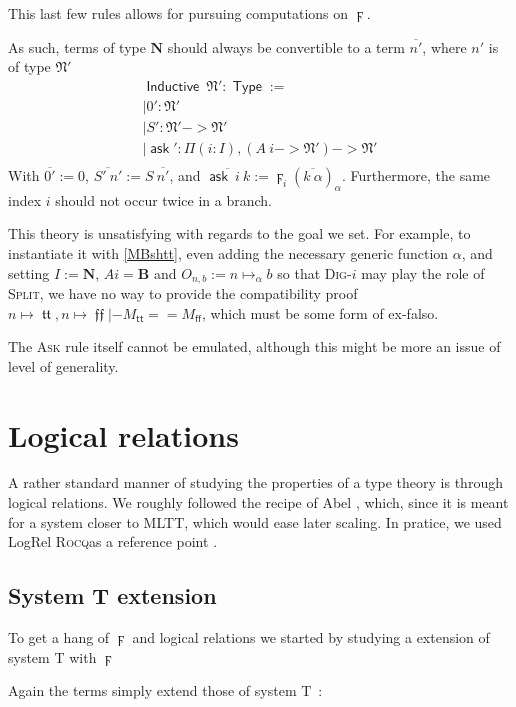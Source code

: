 \documentclass[11pt]{article}
\DeclareMathOperator{\Type}{\mathsf{Type}}
\DeclareMathOperator{\ask}{\mathsf{ask}}
\DeclareMathOperator{\Inductive}{\mathsf{Inductive}}
\DeclareMathOperator{\true}{\mathsf{tt}}
\DeclareMathOperator{\false}{\mathsf{ff}}
\DeclareMathOperator{\mtrue}{\mathfrak{tt}}
\DeclareMathOperator{\mfalse}{\mathfrak{ff}}
\newcommand{\ovl}{\overline}
\newcommand{\0}{\mathbf{0}}
\newcommand{\1}{\mathbf{1}}
\newcommand{\nat}{\mathbf{N}}
\newcommand{\mnat}{\mathfrak{N}}
\newcommand{\bool}{\mathbf{B}}
\newcommand{\rocq}{\textsc{Rocq}}
\begin{document}
This last few rules allows for pursuing computations on $\digamma$.

As such, terms of type $\nat$ should always be convertible to a term $\ovl{n'}$, where $n'$ is of type $\mnat'$
$$
\begin{array}{l}
    \Inductive\ \mnat' : \Type := \\
    \mid 0' : \mnat'\\
    \mid S' : \mnat' -> \mnat'\\
    \mid \ask' : \Pi (i : I),(A\ i -> \mnat') -> \mnat'\\
\end{array}
$$
With $\ovl{0'} := 0$, $\ovl{S'\ n'} := S\ \ovl{n'}$, and $\ovl{\ask\ i\ k} := \digamma_i (\ovl{k\ \alpha})_\alpha$. Furthermore, the same index $i$ should not occur twice in a branch.

This theory is unsatisfying with regards to the goal we set. For example, to instantiate it with \ref{MBshtt}, even adding the necessary generic function $\alpha$, and setting $I := \nat$, $A i = \bool$ and $O_{n,b} := n\mapsto_\alpha b$ so that \textsc{Dig}-$i$ may play the role of \textsc{Split}, we  have no way to provide the compatibility proof $n\mapsto \mtrue, n\mapsto \mfalse |- M_{\true} == M_{\false}$, which must be some form of ex-falso.

The \textsc{Ask} rule itself cannot be emulated, although this might be more an issue of level of generality.

\section{Logical relations}\label{LogRel}

A rather standard manner of studying the properties of a type theory is through logical relations. We roughly followed the recipe of Abel \cite{10.1145/3158111}, which, since it is meant for a system closer to MLTT, which would ease later scaling. In pratice, we used LogRel \rocq as a reference point \cite{DBLP:conf/cpp/AdjedjLMPP24}.

\subsection{System T extension}

To get a hang of $\digamma$ and logical relations we started by studying a extension of system T with $\digamma$

Again the terms simply extend those of system T~:
\end{document}
